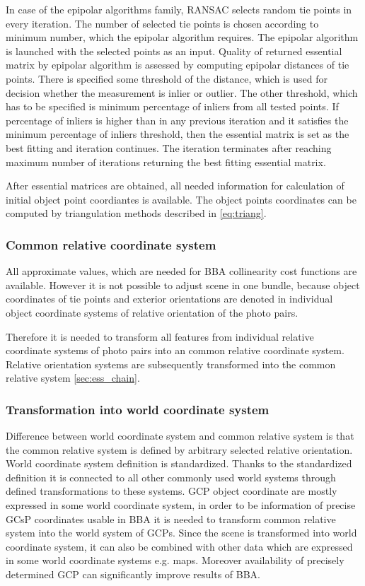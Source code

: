 \documentclass[a4paper,12pt]{article}
\begin{document}
In case of the epipolar algorithms family, RANSAC selects random tie points in every iteration.
The number of selected tie points is chosen according to minimum number, which the epipolar algorithm requires.
The epipolar algorithm is launched with the selected points as an input. 
Quality of returned essential matrix by epipolar algorithm is assessed by 
computing epipolar distances of tie points. There is specified some threshold of the distance, which is used 
for decision whether the measurement is inlier or outlier. The other threshold, which has to be specified 
is minimum percentage of inliers from all tested points. If percentage of inliers is higher than in any previous iteration
and it satisfies the minimum percentage of inliers threshold, then
the essential matrix is set as the best fitting and iteration continues. The iteration terminates after 
reaching maximum number of iterations returning the best fitting essential matrix.

After essential matrices are obtained, all needed information for calculation of initial object point coordiantes
is  available. The object points coordinates can be computed by triangulation methods described in \ref{eq:triang}.


\subsubsection{Common relative coordinate system}

All approximate values, which are needed for BBA collinearity cost functions are available. 
However it is not possible to adjust scene in one bundle, because
object coordinates of tie points and exterior orientations are denoted in  individual object coordinate systems
of relative orientation of the photo pairs.

Therefore it is needed to transform all features from individual relative coordinate systems of photo pairs into 
an common relative coordinate system.
Relative orientation systems are subsequently transformed into the common relative system \ref{sec:ess_chain}. 

\subsubsection{Transformation into world coordinate system}

Difference between world coordinate system and common relative system is that the common relative system 
is defined by arbitrary selected relative orientation. World coordinate system definition is standardized.
Thanks to the standardized definition it is connected to all other commonly used  world systems through 
defined transformations to these systems.
GCP object coordinate are mostly expressed in some world coordinate system, in order to be 
information of precise GCsP coordinates usable in BBA it is needed to transform common relative 
system into the world system of GCPs. Since the scene is transformed into world coordinate system,
it can also be combined with other data which are expressed in some world coordinate systems e.g.
maps. Moreover availability of precisely determined GCP can significantly improve results of BBA.  
\end{document}

